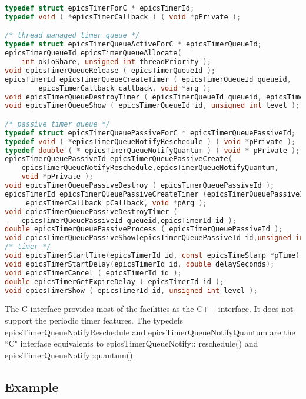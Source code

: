 \begin{lstlisting}[language=C]
typedef struct epicsTimerForC * epicsTimerId;
typedef void ( *epicsTimerCallback ) ( void *pPrivate );

/* thread managed timer queue */
typedef struct epicsTimerQueueActiveForC * epicsTimerQueueId;
epicsTimerQueueId epicsTimerQueueAllocate(
    int okToShare, unsigned int threadPriority );
void epicsTimerQueueRelease ( epicsTimerQueueId );
epicsTimerId epicsTimerQueueCreateTimer ( epicsTimerQueueId queueid,
        epicsTimerCallback callback, void *arg );
void epicsTimerQueueDestroyTimer ( epicsTimerQueueId queueid, epicsTimerId id );
void epicsTimerQueueShow ( epicsTimerQueueId id, unsigned int level );

/* passive timer queue */
typedef struct epicsTimerQueuePassiveForC * epicsTimerQueuePassiveId;
typedef void ( *epicsTimerQueueNotifyReschedule ) ( void *pPrivate );
typedef double ( * epicsTimerQueueNotifyQuantum ) ( void * pPrivate );
epicsTimerQueuePassiveId epicsTimerQueuePassiveCreate(
    epicsTimerQueueNotifyReschedule,epicsTimerQueueNotifyQuantum,
    void *pPrivate );
void epicsTimerQueuePassiveDestroy ( epicsTimerQueuePassiveId );
epicsTimerId epicsTimerQueuePassiveCreateTimer (epicsTimerQueuePassiveId queueid,
     epicsTimerCallback pCallback, void *pArg );
void epicsTimerQueuePassiveDestroyTimer (
    epicsTimerQueuePassiveId queueid,epicsTimerId id );
double epicsTimerQueuePassiveProcess ( epicsTimerQueuePassiveId );
void epicsTimerQueuePassiveShow(epicsTimerQueuePassiveId id,unsigned int level);
/* timer */
void epicsTimerStartTime(epicsTimerId id, const epicsTimeStamp *pTime);
void epicsTimerStartDelay(epicsTimerId id, double delaySeconds);
void epicsTimerCancel ( epicsTimerId id );
double epicsTimerGetExpireDelay ( epicsTimerId id );
void epicsTimerShow ( epicsTimerId id, unsigned int level );
\end{lstlisting}

The C interface provides most of the facilities as the C++ interface. It does not support the periodic timer features. The 
typedefs epicsTimerQueueNotifyReschedule and epicsTimerQueueNotifyQuantum are the ``C" interface equivalents to 
epicsTimerQueueNotify:: reschedule() and epicsTimerQueueNotify::quantum().

\subsection{Example}

